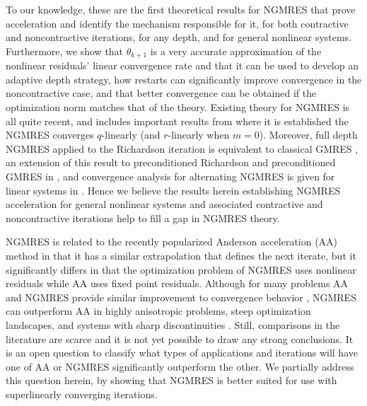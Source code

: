 \documentclass{article}
\numberwithin{equation}{section}
\begin{document}
To our knowledge, these are the first theoretical results for NGMRES that prove acceleration and identify the mechanism responsible for it, for both contractive and noncontractive iterations, for any depth, and for general nonlinear systems.  Furthermore, we show that $\theta_{k+1}$ is a very accurate approximation of the nonlinear residuals' linear convergence rate and that it can be used to develop an adaptive depth strategy, how restarts can significantly improve convergence in the noncontractive case, and that better convergence can be obtained if the optimization norm matches that of the theory.  Existing theory for NGMRES is all quite recent, and includes important results from  \cite{he2025convergence} where it is established the NGMRES converges $q$-linearly (and $r$-linearly when $m=0$). Moreover, full depth NGMRES applied to the Richardson iteration is equivalent to classical GMRES \cite{greif2026convergence}, an extension of this result to preconditioned Richardson and preconditioned GMRES in  \cite{he2026ngmresprecon}, and convergence analysis for alternating NGMRES is given for linear systems in \cite{he2026convergenceANG}.  Hence we believe the results herein establishing NGMRES acceleration for general nonlinear systems and associated contractive and noncontractive iterations help to fill a gap in NGMRES theory.


NGMRES is related to the recently popularized Anderson acceleration (AA) \cite{Anderson65,PR25} method in that it has a similar extrapolation that defines the next iterate, but it significantly differs in that the optimization problem of NGMRES uses nonlinear residuals while AA uses fixed point residuals.  Although for many problems AA and NGMRES provide similar improvement to convergence behavior \cite{HR26b,sterck2021asymptotic}, NGMRES can outperform AA in highly anisotropic problems, steep optimization landscapes, and systems with sharp discontinuities \cite{sterck2012nonlinear,sterck2021asymptotic,he2025generalized}.  Still, comparisons in the literature are scarce and it is not yet possible to draw any strong conclusions.  It is an open question to classify what types of applications and iterations will have one of AA or NGMRES significantly outperform the other.  We partially address this question herein, by showing that NGMRES is better suited for use with superlinearly converging iterations.  
\end{document}
